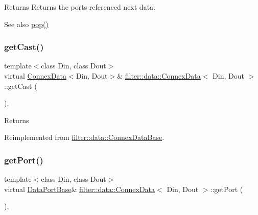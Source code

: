 \begin{DoxyReturn}{Returns}
Returns the port\textquotesingle{}s referenced next data. 
\end{DoxyReturn}
\begin{DoxySeeAlso}{See also}
\hyperlink{classfilter_1_1data_1_1_connex_data_a4367cfe424cefb90470098814a33e326}{pop()} 
\end{DoxySeeAlso}
\mbox{\label{classfilter_1_1data_1_1_connex_data_a631260c24ddd1050c75a2732081a2d9d}} 
\subsubsection{\texorpdfstring{get\+Cast()}{getCast()}}
{\footnotesize\ttfamily template$<$class Din, class Dout$>$ \\
virtual \hyperlink{classfilter_1_1data_1_1_connex_data}{Connex\+Data}$<$Din, Dout$>$\& \hyperlink{classfilter_1_1data_1_1_connex_data}{filter\+::data\+::\+Connex\+Data}$<$ Din, Dout $>$\+::get\+Cast (\begin{DoxyParamCaption}{ }\end{DoxyParamCaption})\hspace{0.3cm}{\ttfamily [inline]}, {\ttfamily [virtual]}}

\begin{DoxyReturn}{Returns}

\end{DoxyReturn}


Reimplemented from \hyperlink{classfilter_1_1data_1_1_connex_data_base_a7c009f9bb553638dd3a0031a8f04b044}{filter\+::data\+::\+Connex\+Data\+Base}.

\mbox{\label{classfilter_1_1data_1_1_connex_data_aecd47354b992800c9d9e69ad951382fb}} 
\subsubsection{\texorpdfstring{get\+Port()}{getPort()}}
{\footnotesize\ttfamily template$<$class Din, class Dout$>$ \\
virtual \hyperlink{classfilter_1_1data_1_1_data_port_base}{Data\+Port\+Base}\& \hyperlink{classfilter_1_1data_1_1_connex_data}{filter\+::data\+::\+Connex\+Data}$<$ Din, Dout $>$\+::get\+Port (\begin{DoxyParamCaption}{ }\end{DoxyParamCaption})\hspace{0.3cm}{\ttfamily [inline]}, {\ttfamily [virtual]}}


